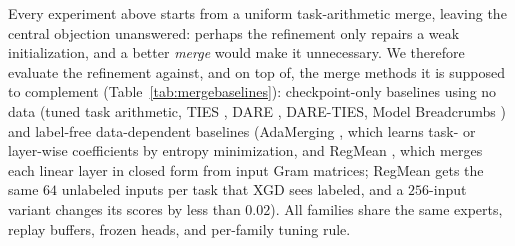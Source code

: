 \documentclass{article} %
\begin{document}
Every experiment above starts from a uniform task-arithmetic merge, leaving the central objection unanswered: perhaps the refinement only repairs a weak initialization, and a better \emph{merge} would make it unnecessary. We therefore evaluate the refinement against, and on top of, the merge methods it is supposed to complement (Table~\ref{tab:mergebaselines}): checkpoint-only baselines using no data (tuned task arithmetic, TIES \citep{yadav2023ties}, DARE \citep{yu2023dare}, DARE-TIES, Model Breadcrumbs \citep{davari2023breadcrumbs}) and label-free data-dependent baselines (AdaMerging \citep{yang2024adamerging}, which learns task- or layer-wise coefficients by entropy minimization, and RegMean \citep{jin2023regmean}, which merges each linear layer in closed form from input Gram matrices; RegMean gets the same $64$ unlabeled inputs per task that XGD sees labeled, and a $256$-input variant changes its scores by less than $0.02$). All families share the same experts, replay buffers, frozen heads, and per-family tuning rule.
\end{document}
